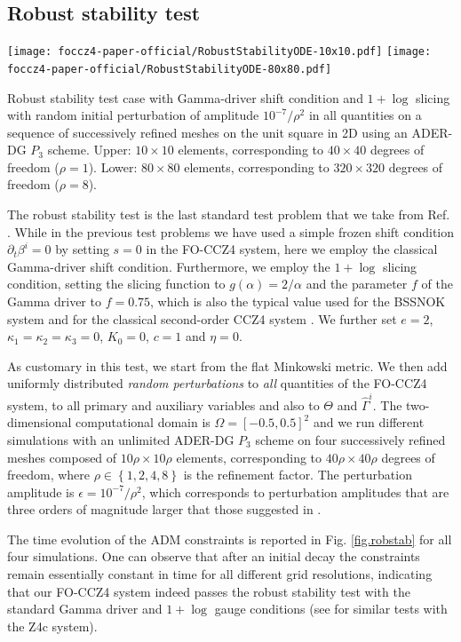 \subsection{Robust stability test}
%
\begin{marginfigure}
	\texttt{[image: foccz4-paper-official/RobustStabilityODE-10x10.pdf]}
	\texttt{[image: foccz4-paper-official/RobustStabilityODE-80x80.pdf]}
	\caption[
	Robust scability test 
	]{Robust stability test case with Gamma-driver shift condition
		and $1+\log$ slicing with random initial perturbation of amplitude
		$10^{-7}/\rho^2$ in all quantities on a sequence of successively
		refined meshes on the unit square in 2D using an ADER-DG $P_3$
		scheme. Upper: $10\times10$ elements, corresponding to $40\times40$
		degrees of freedom ($\rho=1$). Lower: $80\times80$ elements, corresponding
		to $320\times320$ degrees of freedom ($\rho=8$). }
	\label{fig.robstab}
\end{marginfigure}
%
The  robust stability test is the last standard test problem
that we take from Ref. \cite{Alcubierre:2003pc}. While in the previous
test problems we have used a simple frozen shift condition $\partial_t
\beta^i = 0$ by setting $s=0$ in the FO-CCZ4 system, here we employ the
classical Gamma-driver shift condition. Furthermore, we employ the
$1+\log$ slicing condition, setting the slicing function to
$g(\alpha)=2/\alpha$ and the parameter $f$ of the Gamma driver to
$f=0.75$, which is also the typical value used for the BSSNOK system and
for the classical second-order CCZ4 system \cite{Alic:2011a}.
We further set $e=2$, $\kappa_1=\kappa_2=\kappa_3=0$, $K_0=0$,
$c=1$ and $\eta=0$.

As customary in this test, we start from the flat Minkowski metric.
We then add uniformly distributed \textit{random perturbations} to
\textit{all} quantities of the FO-CCZ4 system, \ie to all primary and
auxiliary variables and also to $\Theta$ and $\hat{\Gamma}^i$.  The
two-dimensional computational domain is $\Omega = [-0.5,0.5]^2$ and we
run different simulations with an unlimited ADER-DG $P_3$ scheme on four
successively refined meshes composed of $10 \rho \times 10 \rho$
elements, corresponding to $40 \rho \times 40 \rho$ degrees of freedom,
where $\rho \in \left\{ 1, 2, 4, 8 \right\}$ is the refinement factor.
The perturbation amplitude is $\epsilon = 10^{-7}/\rho^2$, which
corresponds to perturbation amplitudes that are three orders of magnitude
larger that those suggested in \cite{Alcubierre:2003pc}.

The time evolution of the ADM constraints is reported in Fig.
\ref{fig.robstab} for all four simulations. One can observe that after an
initial decay the constraints remain essentially constant in time for all
different grid resolutions, indicating that our FO-CCZ4 system indeed
passes the robust stability test with the standard Gamma driver and
$1+\log$ gauge conditions (see \cite{Cao:2012} for similar tests with the
Z4c system).



